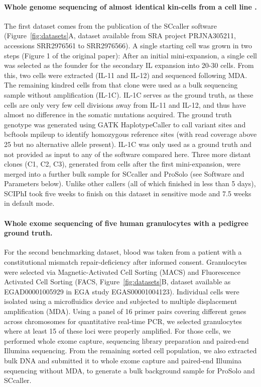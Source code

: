\documentclass[12pt,inline]{wlscirep}
\begin{document}
\paragraph{Whole genome sequencing of almost identical kin-cells from a cell line \cite{dong_accurate_2017}.}
The first dataset comes from the publication of the SCcaller software\cite{dong_accurate_2017} (Figure~\ref{fig:datasets}A, dataset available from SRA project \mbox{PRJNA305211}, accessions \mbox{SRR2976561} to \mbox{SRR2976566}).
A single starting cell was grown in two steps (Figure 1 of the original paper\cite{dong_accurate_2017}):
After an initial mini-expansion, a single cell was selected as the founder for the secondary IL expansion into 20-30 cells.
From this, two cells were extracted (IL-11 and IL-12) and sequenced following MDA.
The remaining kindred cells from that clone were used as a bulk sequencing sample without amplification (IL-1C).
IL-1C serves as the ground truth, as these cells are only very few cell divisions away from IL-11 and IL-12, and thus have almost no difference in the somatic mutations acquired.
The ground truth genotype was generated using GATK HaplotypeCaller to call variant sites and bcftools mpileup to identify homozygous reference sites (with read coverage above 25 but no alternative allele present).
IL-1C was only used as a ground truth and not provided as input to any of the software compared here.
Three more distant clones (C1, C2, C3), generated from cells after the first mini-expansion, were merged into a further bulk sample for SCcaller and ProSolo (see Software and Parameters below).
Unlike other callers (all of which finished in less than 5 days), SCIPhI took five weeks to finish on this dataset in sensitive mode and 7.5 weeks in default mode.\\

\paragraph{Whole exome sequencing of five human granulocytes with a pedigree ground truth.}
\begin{sloppypar}
For the second benchmarking dataset, blood was taken from a patient with a constitutional mismatch repair-deficiency\cite{hoell_constitutional_2014} after informed consent.
Granulocytes were selected via Magnetic-Activated Cell Sorting (MACS) and Fluorescence Activated Cell Sorting (FACS, Figure~\ref{fig:datasets}B, dataset available as \mbox{EGAD00001005929} in EGA study \mbox{EGAS00001004123}).
Individual cells were isolated using a microfluidics device and subjected to multiple displacement amplification (MDA).
Using a panel of 16 primer pairs covering different genes across chromosomes for quantitative real-time PCR, we selected granulocytes where at least 15 of these loci were properly amplified.
For those cells, we performed whole exome capture, sequencing library preparation and paired-end Illumina sequencing.
From the remaining sorted cell population, we also extracted bulk DNA and submitted it to whole exome capture and paired-end Illumina sequencing without MDA, to generate a bulk background sample for ProSolo and SCcaller.
\end{sloppypar}
\end{document}
